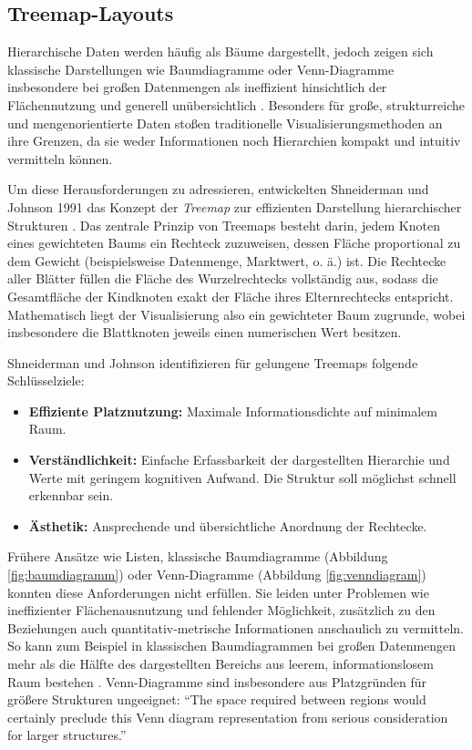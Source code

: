 \subsection{Treemap-Layouts} \label{sec:Treemap}

Hierarchische Daten werden häufig als Bäume dargestellt, jedoch zeigen sich klassische Darstellungen wie Baumdiagramme oder Venn-Diagramme insbesondere bei großen Datenmengen als ineffizient hinsichtlich der Flächennutzung und generell unübersichtlich \cite{johnson1991tree}. Besonders für große, strukturreiche und mengenorientierte Daten stoßen traditionelle Visualisierungsmethoden an ihre Grenzen, da sie weder Informationen noch Hierarchien kompakt und intuitiv vermitteln können.

Um diese Herausforderungen zu adressieren, entwickelten Shneiderman und Johnson 1991 das Konzept der \textit{Treemap} zur effizienten Darstellung hierarchischer Strukturen \cite{johnson1991tree}.
Das zentrale Prinzip von Treemaps besteht darin, jedem Knoten eines gewichteten Baums ein Rechteck zuzuweisen, dessen Fläche proportional zu dem Gewicht (beispielsweise Datenmenge, Marktwert, o. ä.) ist.
Die Rechtecke aller Blätter füllen die Fläche des Wurzelrechtecks vollständig aus, sodass die Gesamtfläche der Kindknoten exakt der Fläche ihres Elternrechtecks entspricht. Mathematisch liegt der Visualisierung also ein gewichteter Baum zugrunde, wobei insbesondere die Blattknoten jeweils einen numerischen Wert besitzen.

Shneiderman und Johnson identifizieren für gelungene Treemaps folgende Schlüsselziele:
\begin{itemize}
    \item \textbf{Effiziente Platznutzung:} Maximale Informationsdichte auf minimalem Raum.
    \item \textbf{Verständlichkeit:} Einfache Erfassbarkeit der dargestellten Hierarchie und Werte mit geringem kognitiven Aufwand. Die Struktur soll möglichst schnell erkennbar sein.
    \item \textbf{Ästhetik:} Ansprechende und übersichtliche Anordnung der Rechtecke.
\end{itemize}

Frühere Ansätze wie Listen, klassische Baumdiagramme (Abbildung \ref{fig:baumdiagramm}) oder Venn-Diagramme (Abbildung \ref{fig:venndiagram}) konnten diese Anforderungen nicht erfüllen. Sie leiden unter Problemen wie ineffizienter Flächenausnutzung und fehlender Möglichkeit, zusätzlich zu den Beziehungen auch quantitativ-metrische Informationen anschaulich zu vermitteln. So kann zum Beispiel in klassischen Baumdiagrammen bei großen Datenmengen mehr als die Hälfte des dargestellten Bereichs aus leerem, informationslosem Raum bestehen \cite[3]{johnson1991tree}. Venn-Diagramme sind insbesondere aus Platzgründen für größere Strukturen ungeeignet: \enquote{The space required between regions would certainly preclude this Venn diagram representation from serious consideration for larger structures.}\cite[5]{johnson1991tree}

